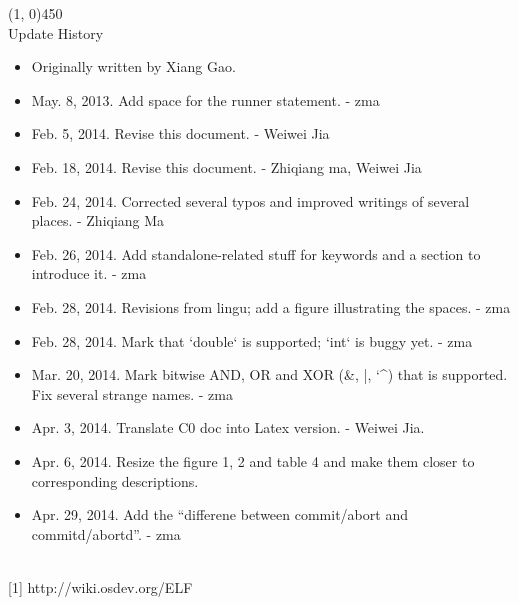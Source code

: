 \documentclass[a4paper]{article}
\begin{document}
\line(1, 0){450}\\

Update History\\

\begin{itemize}
	\item Originally written by Xiang Gao.
	\item May. 8, 2013. Add space for the runner statement. - zma
	\item Feb. 5, 2014. Revise this document. - Weiwei Jia
	\item Feb. 18, 2014. Revise this document. - Zhiqiang ma, Weiwei Jia
	\item Feb. 24, 2014. Corrected several typos and improved writings of several places. - Zhiqiang Ma
	\item Feb. 26, 2014. Add standalone-related stuff for keywords and a section to introduce it. - zma
	\item Feb. 28, 2014. Revisions from lingu; add a figure illustrating the spaces. - zma
	\item Feb. 28, 2014. Mark that `double` is supported; `int` is buggy yet. - zma
	\item Mar. 20, 2014. Mark bitwise AND, OR and XOR (\&, |, {\char`\^}) that is supported. Fix several strange names. - zma
	\item Apr. 3, 2014. Translate C0 doc into Latex version. - Weiwei Jia.
    \item Apr. 6, 2014. Resize the figure 1, 2 and table 4 and make them closer to corresponding descriptions.
    \item Apr. 29, 2014. Add the ``differene between commit/abort and commitd/abortd''. - zma
\end{itemize}

\\

[1] http://wiki.osdev.org/ELF
\end{document}
